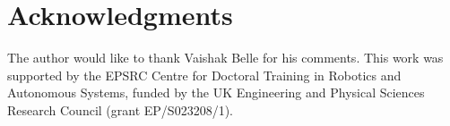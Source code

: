 \documentclass[runningheads]{llncs}
\begin{document}




\section*{Acknowledgments}

The author would like to thank Vaishak Belle for his comments. This work was
supported by the EPSRC Centre for Doctoral Training in Robotics and Autonomous
Systems, funded by the UK Engineering and Physical Sciences Research Council
(grant EP/S023208/1).



\end{document}
